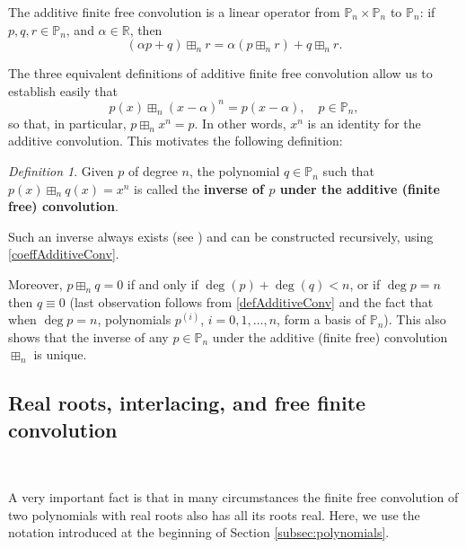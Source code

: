 \documentclass[reqno,11pt]{amsart}
\theoremstyle{remark}
\newtheorem{definition}[theorem]{Definition}
\renewcommand{\P}{\mathbb{P}}
\newcommand{\rr}{\mathbb{R}}
\begin{document}
The additive finite free convolution is a linear operator  from $\P_n \times \P_n$ to $\P_n$: if $p,q,r\in \P_n$,  and $\alpha\in\rr$, then 
\begin{equation*}
    (\alpha p+q)\boxplus_n r= \alpha (p\boxplus_n r)+q\boxplus_n r.
\end{equation*}
 
The three equivalent definitions of additive finite free convolution allow us to establish easily that 
    \begin{equation}
        \label{shift}
        p(x) \boxplus_n (x-\alpha)^n = p(x-\alpha), \quad p\in \P_n,
    \end{equation}
    so that, in particular, $p \boxplus_n x^n = p$. In other words, $x^n$ is an identity for the additive convolution. This motivates the following definition:
    \begin{definition} \label{def:additiveInverse}
  Given $p  $ of degree $n$, the polynomial $q\in \mathbb P_n$ such that $p(x)\boxplus_n q(x)=x^n$ is called the \textbf{inverse of $p$ under the additive (finite free) convolution}.
\end{definition}
Such an inverse always exists (see \cite[Corollary 6.2]{marcus}) and can be constructed recursively, using \eqref{coeffAdditiveConv}. 

Moreover, $p \boxplus_n q =0$ if and only if $\deg(p)+\deg(q) < n$, or if $\deg p=n$ then $q\equiv 0$ (last observation follows from \eqref{defAdditiveConv} and the fact that when $\deg p=n$, polynomials $p^{(i)}$, $i=0, 1, \dots, n$, form a basis of $\mathbb P_n$). This also shows that the inverse of any $p\in \P_n$ under the additive (finite free) convolution $\boxplus_n$ is unique. 
 

\subsection{Real roots, interlacing, and free finite convolution} \label{sec:realrootednessfreeconv}\

A very important fact is that in many circumstances the finite free convolution of two polynomials with real roots also has all its roots real. Here, we use the notation introduced at the beginning of Section \ref{subsec:polynomials}. 
\end{document}
